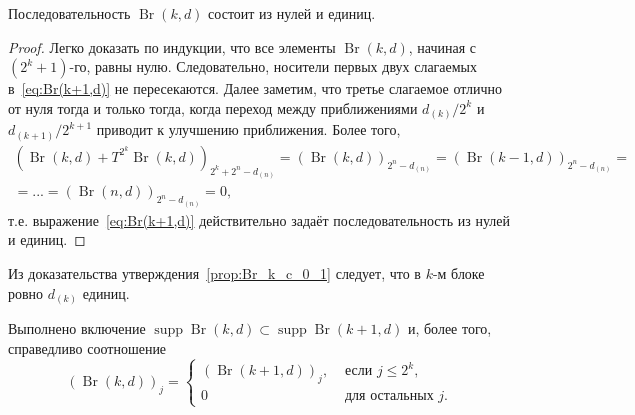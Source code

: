 \begin{proposition}
	\label{prop:Br_k_c_0_1}
	Последовательность $\operatorname{Br}(k,d)$ состоит из нулей и единиц.
\end{proposition}
\begin{proof}
	Легко доказать по индукции, что все элементы $\operatorname{Br}(k,d)$, начиная с $(2^k+1)$-го, равны нулю.
	Следовательно, носители первых двух слагаемых в~\eqref{eq:Br(k+1,d)} не пересекаются.
	Далее заметим, что третье слагаемое отлично от нуля тогда и только тогда,
	когда переход между приближениями $d_{(k)} / 2^k$ и $d_{(k+1)}/2^{k+1}$
	приводит к улучшению приближения.
	Более того,
	\begin{multline}
		\left(\operatorname{Br}(k,d) + T^{2^k}\operatorname{Br}(k,d)\right)_{2^k+2^n-d_{(n)}}
		=
		(\operatorname{Br}(k,d))_{2^n-d_{(n)}}
		=
		(\operatorname{Br}(k-1,d))_{2^n-d_{(n)}}
		=
		\\=
		...
		=
		(\operatorname{Br}(n,d))_{2^n-d_{(n)}}
		=
		0
		,
	\end{multline}
	т.е. выражение~\eqref{eq:Br(k+1,d)} действительно задаёт последовательность из нулей и единиц.
\end{proof}

\begin{remark}
	Из доказательства утверждения~\ref{prop:Br_k_c_0_1} следует, что в $k$-м блоке ровно $d_{(k)}$ единиц.
\end{remark}


\begin{remark}
	Выполнено включение $\operatorname{supp}\operatorname{Br}(k,d) \subset \operatorname{supp}\operatorname{Br}(k+1,d)$
	и, более того, справедливо соотношение
	\begin{equation}
		(\operatorname{Br}(k,d))_j = \begin{cases}
			(\operatorname{Br}(k+1,d))_j, & \mbox{~если~}  j \leq 2^k,
			\\
			0  & \mbox{~для остальных~} j
			.
		\end{cases}
	\end{equation}
\end{remark}

